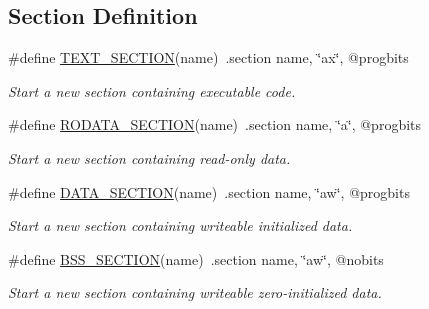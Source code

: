 \subsection*{Section Definition}
\begin{DoxyCompactItemize}
\item 
\hypertarget{group__assembler__group_ga8e8471b5cb4a0e8bc8cefb35cc8ebb3d}{\#define \hyperlink{group__assembler__group_ga8e8471b5cb4a0e8bc8cefb35cc8ebb3d}{T\-E\-X\-T\-\_\-\-S\-E\-C\-T\-I\-O\-N}(name)~.section name, \char`\"{}ax\char`\"{}, @progbits}\label{group__assembler__group_ga8e8471b5cb4a0e8bc8cefb35cc8ebb3d}

\begin{DoxyCompactList}\small\item\em Start a new section containing executable code. \end{DoxyCompactList}\item 
\hypertarget{group__assembler__group_gadd34e4da24622d99c3b28211c28cac68}{\#define \hyperlink{group__assembler__group_gadd34e4da24622d99c3b28211c28cac68}{R\-O\-D\-A\-T\-A\-\_\-\-S\-E\-C\-T\-I\-O\-N}(name)~.section name, \char`\"{}a\char`\"{}, @progbits}\label{group__assembler__group_gadd34e4da24622d99c3b28211c28cac68}

\begin{DoxyCompactList}\small\item\em Start a new section containing read-\/only data. \end{DoxyCompactList}\item 
\hypertarget{group__assembler__group_ga2d1becf75eb73256b236ed19b28f76bf}{\#define \hyperlink{group__assembler__group_ga2d1becf75eb73256b236ed19b28f76bf}{D\-A\-T\-A\-\_\-\-S\-E\-C\-T\-I\-O\-N}(name)~.section name, \char`\"{}aw\char`\"{}, @progbits}\label{group__assembler__group_ga2d1becf75eb73256b236ed19b28f76bf}

\begin{DoxyCompactList}\small\item\em Start a new section containing writeable initialized data. \end{DoxyCompactList}\item 
\hypertarget{group__assembler__group_ga9c174ffe0958450a515a04007564fc19}{\#define \hyperlink{group__assembler__group_ga9c174ffe0958450a515a04007564fc19}{B\-S\-S\-\_\-\-S\-E\-C\-T\-I\-O\-N}(name)~.section name, \char`\"{}aw\char`\"{}, @nobits}\label{group__assembler__group_ga9c174ffe0958450a515a04007564fc19}

\begin{DoxyCompactList}\small\item\em Start a new section containing writeable zero-\/initialized data. \end{DoxyCompactList}\end{DoxyCompactItemize}


